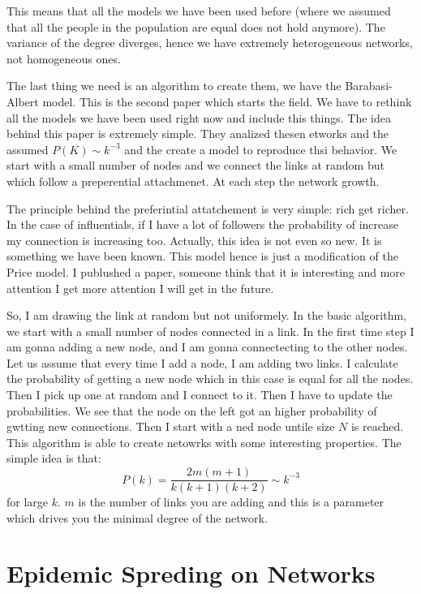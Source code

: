 \documentclass[../main/main.tex]{subfiles}
\begin{document}
This means that all the models we have been used before (where we assumed that all the people in the population are equal does not hold anymore). The variance of the degree diverges, hence we have extremely heterogeneous networks, not homogeneous ones.

The last thing we need is an algorithm to create them, we have the Barabasi-Albert model. This is the second paper which starts the field. We have to rethink all the models we have been used right now and include this things.
The idea behind this paper is extremely simple. They analized thesen etworks and the assumed \( P(K) \sim k^{-3} \) and the create a model to reproduce thsi behavior. We start with a small number of nodes and we connect the links at random but which follow a preperential attachmenet. At each step the network growth.

The principle behind the preferintial attatchement is very simple: rich get richer. In the case of influentials, if I have a lot of followers the probability of increase my connection is increasing too. Actually, this idea is not even so new. It is something we have been known. This model hence is just a modification of the Price model. I publushed a paper, someone think that it is interesting and more attention I get more attention I will get in the future.

So, I am drawing the link at random but not uniformely. In the basic algorithm, we start with a small number of nodes connected in a link. In the first time step I am gonna adding a new node, and I am gonna connectecting to the other nodes. Let us assume that every time I add a node, I am adding two links. I calculate the probability of getting a new node which in this case is equal for all the nodes. Then I pick up one at random and I connect to it. Then I have to update the probabilities. We see that the node on the left got an higher probability of gwtting new connections. Then I start with a ned node untile size \( N \) is reached. This algorithm is able to create netowrks with some interesting properties. The simple idea is that:
\begin{equation*}
  P(k) = \frac{2 m (m +1)}{k(k+1)(k+2)} \sim k^{-3}
\end{equation*}
for large \( k \). \( m \) is the number of links you are adding and this is a parameter which drives you the minimal degree of the network.


\section{Epidemic Spreding on Networks}
\end{document}
